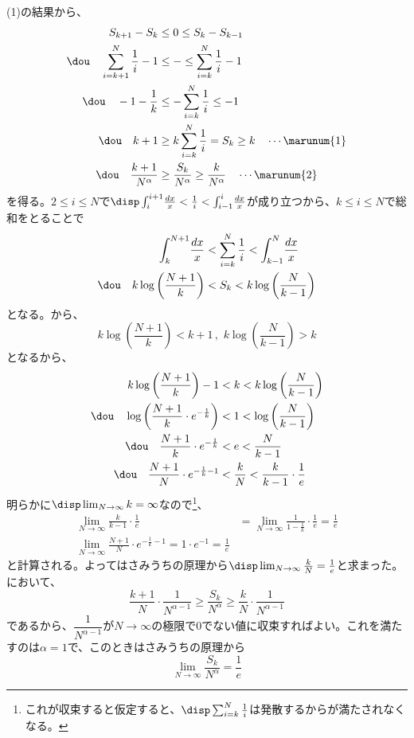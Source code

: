 (1)の結果から、
\begin{align*}
 S_{k+1}-S_k&\le 0\le S_k-S_{k-1} \\
 \dou\quad \sum_{i=k+1}^N\frac{1}{i}-1 &\le -\le \sum_{i=k}^N\frac{1}{i}-1 \\
 \dou\quad -1-\frac{1}{k}&\le -\sum_{i=k}^N\frac{1}{i}\le -1 \\
 \dou\quad k+1&\ge k\sum_{i=k}^N\frac{1}{i}=S_k\ge k \quad\cdots\marunum{1} \\
 \dou\quad \frac{k+1}{N^\alpha}&\ge \frac{S_k}{N^\alpha}\ge \frac{k}{N^\alpha} \quad\cdots\marunum{2}
\end{align*}
を得る。$2\le i\le N$で$\disp \int_i^{i+1}\!\frac{dx}{x}< \frac{1}{i} < \int_{i-1}^i\!\frac{dx}{x}$が成り立つから、$k\le i\le N$で総和をとることで
\begin{align*}
 \int_{k}^{N+1}\!\frac{dx}{x} &< \sum_{i=k}^N\frac{1}{i}<\int_{k-1}^N\!\frac{dx}{x} \\
 \dou\quad k\log\left(\frac{N+1}{k}\right) &< S_k < k\log\left(\frac{N}{k-1}\right)
\end{align*}
となる。から、
\[ k\log\left(\frac{N+1}{k}\right) < k+1 \,,\,\, k\log\left(\frac{N}{k-1}\right) > k \]
となるから、
\begin{align*}
 k\log\left(\frac{N+1}{k}\right)-1 &< k < k\log\left(\frac{N}{k-1}\right) \\
 \dou\quad \log\left(\frac{N+1}{k}\cdot e^{-\frac{1}{k}}\right) &< 1 < \log\left(\frac{N}{k-1}\right) \\
 \dou\quad \frac{N+1}{k}\cdot e^{-\frac{1}{k}} &< e < \frac{N}{k-1} \\
 \dou\quad \frac{N+1}{N}\cdot e^{-\frac{1}{k}-1} &< \frac{k}{N} < \frac{k}{k-1}\cdot \frac{1}{e}
\end{align*}
明らかに$\disp \lim_{N\to\infty} k=\infty$なので\footnote{これが収束すると仮定すると、$\disp \sum_{i=k}^N\frac{1}{i}$は発散するからが満たされなくなる。}、
\begin{align*}
 \lim_{N\to\infty}\frac{k}{k-1}\cdot \frac{1}{e}&=\lim_{N\to\infty}\frac{1}{1-\frac{1}{k}}\cdot\frac{1}{e}=\frac{1}{e} \\
 \lim_{N\to\infty} \frac{N+1}{N}\cdot e^{-\frac{1}{k}-1}=1\cdot e^{-1}=\frac{1}{e}
\end{align*}
と計算される。よってはさみうちの原理から$\disp \lim_{N\to\infty} \frac{k}{N}=\frac{1}{e}$と求まった。において、
\[ \frac{k+1}{N}\cdot \frac{1}{N^{\alpha-1}}\ge \frac{S_k}{N^\alpha}\ge \frac{k}{N}\cdot \frac{1}{N^{\alpha-1}} \]
であるから、$\dfrac{1}{N^{\alpha-1}}$が$N\to\infty$の極限で0でない値に収束すればよい。これを満たすのは$\alpha=1$で、このときはさみうちの原理から
\[ \lim_{N\to\infty} \frac{S_k}{N^\alpha}=\frac{1}{e} \]
